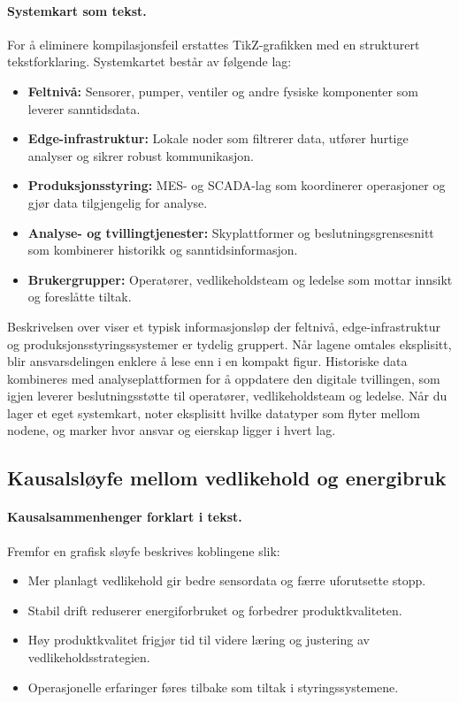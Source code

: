 \paragraph{Systemkart som tekst.} For å eliminere kompilasjonsfeil erstattes TikZ-grafikken med en strukturert tekstforklaring. Systemkartet består av følgende lag:
\begin{itemize}
    \item \textbf{Feltnivå:} Sensorer, pumper, ventiler og andre fysiske komponenter som leverer sanntidsdata.
    \item \textbf{Edge-infrastruktur:} Lokale noder som filtrerer data, utfører hurtige analyser og sikrer robust kommunikasjon.
    \item \textbf{Produksjonsstyring:} MES- og SCADA-lag som koordinerer operasjoner og gjør data tilgjengelig for analyse.
    \item \textbf{Analyse- og tvillingtjenester:} Skyplattformer og beslutningsgrensesnitt som kombinerer historikk og sanntidsinformasjon.
    \item \textbf{Brukergrupper:} Operatører, vedlikeholdsteam og ledelse som mottar innsikt og foreslåtte tiltak.
\end{itemize}

Beskrivelsen over viser et typisk informasjonsløp der feltnivå, edge-infrastruktur og produksjonsstyringssystemer er tydelig gruppert. Når lagene omtales eksplisitt, blir ansvarsdelingen enklere å lese enn i en kompakt figur. Historiske data kombineres med analyseplattformen for å oppdatere den digitale tvillingen, som igjen leverer beslutningsstøtte til operatører, vedlikeholdsteam og ledelse. Når du lager et eget systemkart, noter eksplisitt hvilke datatyper som flyter mellom nodene, og marker hvor ansvar og eierskap ligger i hvert lag.

\subsection{Kausalsløyfe mellom vedlikehold og energibruk}
\paragraph{Kausalsammenhenger forklart i tekst.} Fremfor en grafisk sløyfe beskrives koblingene slik:
\begin{itemize}
    \item Mer planlagt vedlikehold gir bedre sensordata og færre uforutsette stopp.
    \item Stabil drift reduserer energiforbruket og forbedrer produktkvaliteten.
    \item Høy produktkvalitet frigjør tid til videre læring og justering av vedlikeholdsstrategien.
    \item Operasjonelle erfaringer føres tilbake som tiltak i styringssystemene.
\end{itemize}

